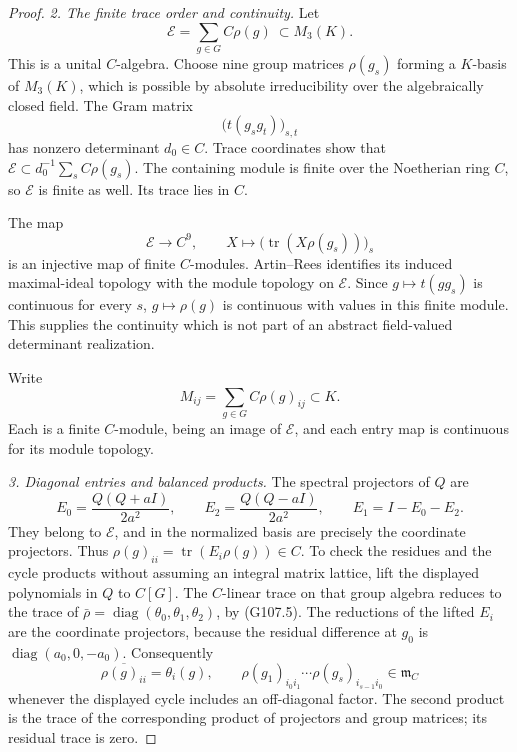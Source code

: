 \begin{proof}
\emph{2. The finite trace order and continuity.}
Let
\[
                  \mathcal E=\sum_{g\in G}C\rho(g)
                      \ \subset M_3(K).
 \tag{G107.13}
\]
This is a unital \(C\)-algebra.
Choose nine group matrices \(\rho(g_s)\) forming a
\(K\)-basis of \(M_3(K)\), which is possible by absolute
irreducibility over the algebraically closed field.
The Gram matrix
\[
             \bigl(t(g_sg_t)\bigr)_{s,t}
 \tag{G107.14}
\]
has nonzero determinant \(d_0\in C\).
Trace coordinates show that
\(\mathcal E\subset d_0^{-1}\sum_s C\rho(g_s)\).
The containing module is finite over the Noetherian ring
\(C\), so \(\mathcal E\) is finite as well.
Its trace lies in \(C\).

The map
\[
 \mathcal E\longrightarrow C^9,\qquad
 X\longmapsto
       \bigl(\operatorname{tr}(X\rho(g_s))\bigr)_s
 \tag{G107.15}
\]
is an injective map of finite \(C\)-modules.
Artin--Rees identifies its induced maximal-ideal topology
with the module topology on \(\mathcal E\).
Since \(g\mapsto t(gg_s)\) is continuous for every \(s\),
\(g\mapsto\rho(g)\) is continuous with values in this
finite module.  This supplies the continuity which is
not part of an abstract field-valued determinant realization.

Write
\[
       M_{ij}=\sum_{g\in G}C\rho(g)_{ij}\subset K.
 \tag{G107.16}
\]
Each is a finite \(C\)-module, being an image of
\(\mathcal E\), and each entry map is continuous for
its module topology.

\emph{3. Diagonal entries and balanced products.}
The spectral projectors of \(Q\) are
\[
 E_0=\frac{Q(Q+aI)}{2a^2},\qquad
 E_2=\frac{Q(Q-aI)}{2a^2},\qquad E_1=I-E_0-E_2.
 \tag{G107.17}
\]
They belong to \(\mathcal E\), and in the normalized
basis are precisely the coordinate projectors.
Thus
\(\rho(g)_{ii}=\operatorname{tr}(E_i\rho(g))\in C\).
To check the residues and the cycle products without
assuming an integral matrix lattice, lift the displayed
polynomials in \(Q\) to \(C[G]\).
The \(C\)-linear trace on that group algebra reduces
to the trace of
\(\bar\rho=\operatorname{diag}(\theta_0,\theta_1,\theta_2)\),
by (G107.5).
The reductions of the lifted \(E_i\) are the coordinate
projectors, because the residual difference at \(g_0\)
is \(\operatorname{diag}(a_0,0,-a_0)\).
Consequently
\[
 \overline{\rho(g)_{ii}}=\theta_i(g),\qquad
 \rho(g_1)_{i_0i_1}\cdots
 \rho(g_s)_{i_{s-1}i_0}\in\mathfrak m_C
 \tag{G107.18}
\]
whenever the displayed cycle includes an off-diagonal
factor.  The second product is the trace of the
corresponding product of projectors and group matrices;
its residual trace is zero.


\end{proof}
